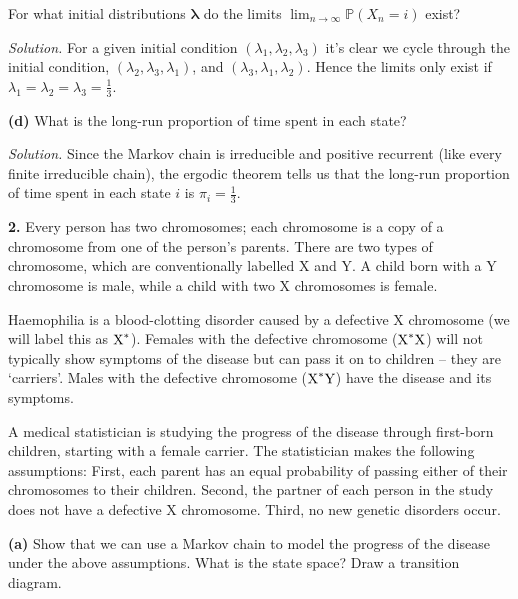 \documentclass[
  a4paper,
]{article}
\theoremstyle{definition}
\theoremstyle{definition}
\theoremstyle{definition}
\theoremstyle{remark}
\begin{document}
For what initial distributions \(\boldsymbol\lambda\) do the limits \(\lim_{n \to \infty} \mathbb P(X_n = i)\) exist?

\begin{myanswers}

\emph{Solution.}
For a given initial condition \((\lambda_1, \lambda_2, \lambda_3)\) it's clear we cycle through the initial condition, \((\lambda_2, \lambda_3, \lambda_1)\), and \((\lambda_3, \lambda_1, \lambda_2)\). Hence the limits only exist if \(\lambda_1 = \lambda_2 = \lambda_3 = \frac13\).

\end{myanswers}

\textbf{(d)} What is the long-run proportion of time spent in each state?

\begin{myanswers}

\emph{Solution.}
Since the Markov chain is irreducible and positive recurrent (like every finite irreducible chain), the ergodic theorem tells us that the long-run proportion of time spent in each state \(i\) is \(\pi_i = \frac13\).

\end{myanswers}

\textbf{2.} Every person has two chromosomes; each chromosome is a copy of a chromosome from one of the person's parents. There are two types of chromosome, which are conventionally labelled X and Y. A child born with a Y chromosome is male, while a child with two X chromosomes is female.

Haemophilia is a blood-clotting disorder caused by a defective X chromosome (we will label this as \(\text X^*\)). Females with the defective chromosome (\(\text X^*\text X\)) will not typically show symptoms of the disease but can pass it on to children -- they are `carriers'. Males with the defective chromosome (\(\text X^* \text Y\)) have the disease and its symptoms.

A medical statistician is studying the progress of the disease through first-born children, starting with a female carrier. The statistician makes the following assumptions: First, each parent has an equal probability of passing either of their chromosomes to their children. Second, the partner of each person in the study does not have a defective X chromosome. Third, no new genetic disorders occur.

\textbf{(a)} Show that we can use a Markov chain to model the progress of the disease under the above assumptions. What is the state space? Draw a transition diagram.
\end{document}

